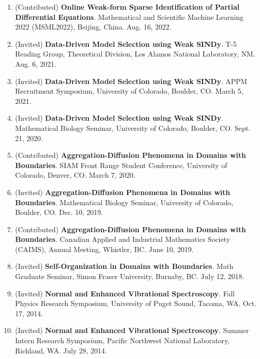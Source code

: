 \documentclass[letterpaper,11pt,oneside]{article}
\begin{document}
\begin{enumerate}
\item (Contributed) \textbf{Online Weak-form Sparse Identification of Partial Differential Equations}. Mathematical and Scientific Machine Learning 2022 (MSML2022), Beijing, China. Aug. 16, 2022.
\item (Invited) \textbf{Data-Driven Model Selection using Weak SINDy}. T-5 Reading Group, Theoretical Division, Los Alamos National Laboratory, NM. Aug. 6, 2021.
\item (Invited) \textbf{Data-Driven Model Selection using Weak SINDy}. APPM Recruitment Symposium, University of Colorado, Boulder, CO. March 5, 2021.
\item (Invited) \textbf{Data-Driven Model Selection using Weak SINDy}. Mathematical Biology Seminar, University of Colorado, Boulder, CO. Sept. 21, 2020.
\item (Contributed) \textbf{Aggregation-Diffusion Phenomena in Domains with Boundaries}. SIAM Front Range Student Conference, University of Colorado, Denver, CO. March 7, 2020.
\item (Invited) \textbf{Aggregation-Diffusion Phenomena in Domains with Boundaries}. Mathematical Biology Seminar, University of Colorado, Boulder, CO. Dec. 10, 2019.
\item (Contributed) \textbf{Aggregation-Diffusion Phenomena in Domains with Boundaries}. Canadian Applied and Industrial Mathematics Society (CAIMS), Annual Meeting, Whistler, BC. June 10, 2019.
\item (Invited) \textbf{Self-Organization in Domains with Boundaries}. Math Graduate Seminar, Simon Fraser University, Burnaby, BC. July 12, 2018.
\item (Invited) \textbf{Normal and Enhanced Vibrational Spectroscopy}. Fall Physics Research Symposium, University of Puget Sound, Tacoma, WA. Oct. 17, 2014.
\item (Invited) \textbf{Normal and Enhanced Vibrational Spectroscopy}. Summer Intern Research Symposium, Pacific Northwest National Laboratory, Richland, WA. July 28, 2014.
\end{enumerate}
\end{document}
